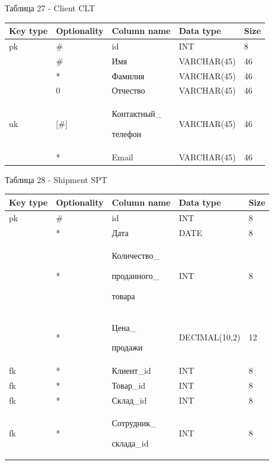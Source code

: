 \documentclass[14pt]{extreport}
\begin{document}
\noindent
Таблица 27 - Client CLT
\begin{center}
\begin{longtable}{ |m{1.3cm}|m{2.7cm}|m{4.5cm}|m{3.5cm}|m{1.8cm}| } 
 \hline
 Key type & Optionality & Column name & Data type & Size \\ [0.5ex] 
 \hline\hline
 pk & \# & id & INT & 8 \\
 \hline
  & \# & Имя & VARCHAR(45) & 46 \\
 \hline
  & * & Фамилия & VARCHAR(45) & 46 \\
 \hline
  & 0 & Отчество & VARCHAR(45) & 46 \\
 \hline
 uk & [\#] & Контактный\_
 
 телефон & VARCHAR(45) & 46 \\
 \hline
  & * & Email & VARCHAR(45) & 46 \\
 \hline
\end{longtable}
\end{center}


\noindent
Таблица 28 - Shipment SPT
\begin{center}
\begin{longtable}{ |m{1.3cm}|m{2.7cm}|m{4.5cm}|m{3.5cm}|m{1.8cm}| } 
 \hline
 Key type & Optionality & Column name & Data type & Size \\ [0.5ex] 
 \hline\hline
 pk & \# & id & INT & 8 \\
 \hline
  & * & Дата & DATE & 8 \\
 \hline
  & * & Количество\_
  
  проданного\_
  
  товара & INT & 8 \\
 \hline
  & * & Цена\_
  
  продажи & DECIMAL(10,2) & 12 \\
 \hline
 fk & * & Клиент\_id & INT & 8 \\
 \hline
 fk & * & Товар\_id & INT & 8 \\
 \hline
 fk & * & Склад\_id & INT & 8 \\
 \hline
 fk & * & Сотрудник\_
 
 склада\_id & INT & 8 \\
 \hline
\end{longtable}
\end{center}


\newpage
\end{document}
